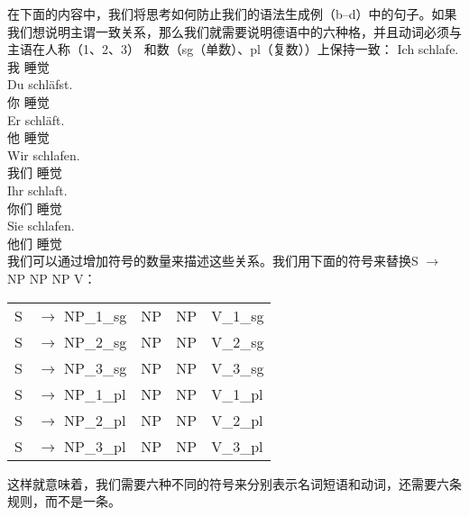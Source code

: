 在下面的内容中，我们将思考如何防止我们的语法生成例（b--d）中的句子。如果我们想说明主谓一致关系，那么我们就需要说明德语中的六种格，并且动词必须与主语在人称（1、2、3） 和数（sg（单数）、pl（复数））上保持一致：
\eal\jamwidth=8cm\relax%
\ex 
\gll Ich schlafe.\\
     我 睡觉\\      
\ex 
\gll Du schläfst.\\
     你 睡觉\\      
\ex 
\gll Er schläft.\\
     他 睡觉\\      
\ex 
\gll Wir schlafen.\\
     我们 睡觉\\       
\ex 
\gll Ihr schlaft.\\
     你们 睡觉\\       
\ex 
\gll Sie schlafen.\\   
     他们 睡觉\\      
\zl
我们可以通过增加符号的数量来描述这些关系。我们用下面的符号来替换S $\to$ NP NP NP V：
\ea
\begin{tabular}[t]{@{}l@{ }l@{~~}l@{~~}l@{~~}l}
S  & $\to$ NP\_1\_sg & NP & NP & V\_1\_sg\\
S  & $\to$ NP\_2\_sg & NP & NP & V\_2\_sg\\
S  & $\to$ NP\_3\_sg & NP & NP & V\_3\_sg\\
S  & $\to$ NP\_1\_pl & NP & NP & V\_1\_pl\\
S  & $\to$ NP\_2\_pl & NP & NP & V\_2\_pl\\
S  & $\to$ NP\_3\_pl & NP & NP & V\_3\_pl\\
\end{tabular}
\z
这样就意味着，我们需要六种不同的符号来分别表示名词短语和动词，还需要六条规则，而不是一条。

